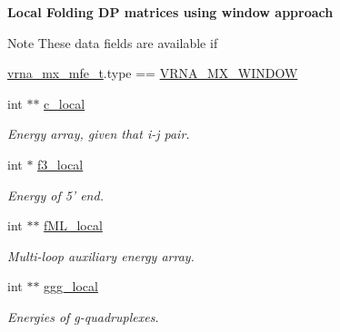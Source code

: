 \begin{Indent}{\bf Local Folding D\-P matrices using window approach}\par
{\em \begin{DoxyNote}{Note}
These data fields are available if 
\begin{DoxyCode}
\hyperlink{group__dp__matrices_structvrna__mx__mfe__s}{vrna\_mx\_mfe\_t}.type == \hyperlink{group__dp__matrices_gga6042ea1d58d01931e959791be6d89343a2ea5d5947f6ec02544934b0ff2785e99}{VRNA\_MX\_WINDOW} 
\end{DoxyCode}
 
\end{DoxyNote}
}\begin{DoxyCompactItemize}
\item 
\hypertarget{group__dp__matrices_a116c677ece0832e6ab9cc2fd1ebfe452}{int $\ast$$\ast$ \hyperlink{group__dp__matrices_a116c677ece0832e6ab9cc2fd1ebfe452}{c\-\_\-local}}\label{group__dp__matrices_a116c677ece0832e6ab9cc2fd1ebfe452}

\begin{DoxyCompactList}\small\item\em Energy array, given that i-\/j pair. \end{DoxyCompactList}\item 
\hypertarget{group__dp__matrices_a6eae0a2b696b0c63bbaa78a70b950600}{int $\ast$ \hyperlink{group__dp__matrices_a6eae0a2b696b0c63bbaa78a70b950600}{f3\-\_\-local}}\label{group__dp__matrices_a6eae0a2b696b0c63bbaa78a70b950600}

\begin{DoxyCompactList}\small\item\em Energy of 5' end. \end{DoxyCompactList}\item 
\hypertarget{group__dp__matrices_ad37d705240a8e6b1e9a4e4ea19e74003}{int $\ast$$\ast$ \hyperlink{group__dp__matrices_ad37d705240a8e6b1e9a4e4ea19e74003}{f\-M\-L\-\_\-local}}\label{group__dp__matrices_ad37d705240a8e6b1e9a4e4ea19e74003}

\begin{DoxyCompactList}\small\item\em Multi-\/loop auxiliary energy array. \end{DoxyCompactList}\item 
\hypertarget{group__dp__matrices_afd3ea65bc8f06559f7f1ea79072fa385}{int $\ast$$\ast$ \hyperlink{group__dp__matrices_afd3ea65bc8f06559f7f1ea79072fa385}{ggg\-\_\-local}}\label{group__dp__matrices_afd3ea65bc8f06559f7f1ea79072fa385}

\begin{DoxyCompactList}\small\item\em Energies of g-\/quadruplexes. \end{DoxyCompactList}\end{DoxyCompactItemize}
\end{Indent}
